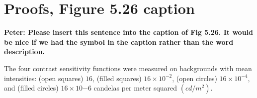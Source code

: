 


\doublesp

\section*{Proofs, Figure 5.26 caption}

{\bf Peter: Please insert this sentence into the caption of Fig 5.26.
It would be nice if we had the symbol in the caption rather than the
word description.}

The four contrast sensitivity functions were measured on backgrounds
with mean intensities: (open squares) $16$, (filled squares) $16
\times 10^{-2}$, (open circles) $16 \times 10^{-4}$, and (filled
circles) $16 \times 10{-6}$ candelas per meter squared $(cd /m^2)$.



